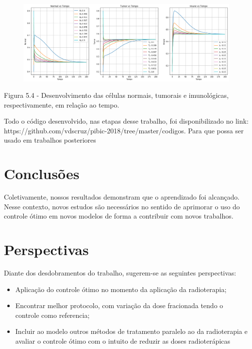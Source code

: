 \documentclass[12pt, a4paper]{article}
\begin{document}
\begin{center}
\begin{figure}[tbh!]
	\centering
    \includegraphics[scale=0.4]{imgs/res_4.png}

  \end{figure}

Figura 5.4 - Desenvolvimento das células normais, tumorais e imunológicas, respectivamente, em relação ao tempo.
\end{center}

Todo o código desenvolvido, nas etapas desse trabalho, foi disponibilizado no link: https://github.com/vdscruz/pibic-2018/tree/master/codigos. Para que possa ser usado em trabalhos posteriores

\newpage

\section{Conclusões}

Coletivamente, nossos resultados demonstram que o aprendizado foi alcançado. Nesse contexto, novos estudos são necessários no sentido de aprimorar o uso do controle ótimo em novos modelos de forma a contribuir com novos trabalhos.

\newpage

\section{Perspectivas}

Diante dos desdobramentos do trabalho, sugerem-se as seguintes perspectivas:
\begin{itemize}
\item Aplicação do controle ótimo no momento da aplicação da radioterapia;
\item Encontrar melhor protocolo, com variação da dose fracionada tendo o controle como referencia;
\item Incluir ao modelo outros métodos de tratamento paralelo ao da radioterapia e avaliar o controle ótimo com o intuito de reduzir as doses radioterápicas
\end{itemize}	
	
\end{document}
